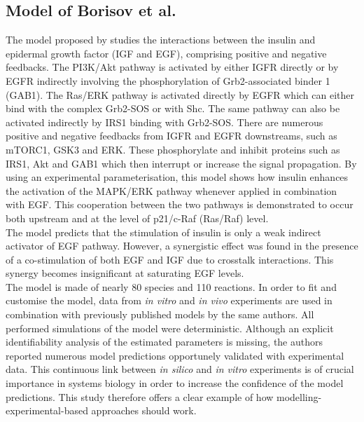 \subsection{Model of Borisov et al.}
\label{subsec:Model of Borisov et al.}
The model proposed by \citep{Borisov2009} studies the interactions between the insulin and epidermal growth factor (IGF and EGF), comprising positive and negative feedbacks. The PI3K/Akt pathway is activated by either IGFR directly or by EGFR indirectly involving the phosphorylation of Grb2-associated binder 1 (GAB1). The Ras/ERK pathway is activated directly by EGFR which can either bind with the complex Grb2-SOS or with Shc. The same pathway can also be activated indirectly by IRS1 binding with Grb2-SOS. There are numerous positive and negative feedbacks from IGFR and EGFR downstreams, such as mTORC1, GSK3 and ERK. These phosphorylate and inhibit proteins such as IRS1, Akt and GAB1 which then interrupt or increase the signal propagation. By using an experimental parameterisation, this model shows how insulin enhances the activation of the MAPK/ERK pathway whenever applied in combination with EGF. This cooperation between the two pathways is demonstrated to occur both upstream and at the level of p21/c-Raf (Ras/Raf) level.\\
The model predicts that the stimulation of insulin is only a weak indirect activator of EGF pathway. However, a synergistic effect was found in the presence of a co-stimulation of both EGF and IGF due to crosstalk interactions. This synergy becomes insignificant at saturating EGF levels.\\
The model is made of nearly 80 species and 110 reactions. In order to fit and customise the model, data from \emph{in vitro} and \emph{in vivo} experiments are used in combination with previously published models by the same authors. All performed simulations of the model were deterministic. Although an explicit identifiability analysis of the estimated parameters is missing, the authors reported numerous model predictions opportunely validated with experimental data. This continuous link between \emph{in silico} and \emph{in vitro} experiments is of crucial importance in systems biology in order to increase the confidence of the model predictions. This study therefore offers a clear example of how modelling-experimental-based approaches should work.

